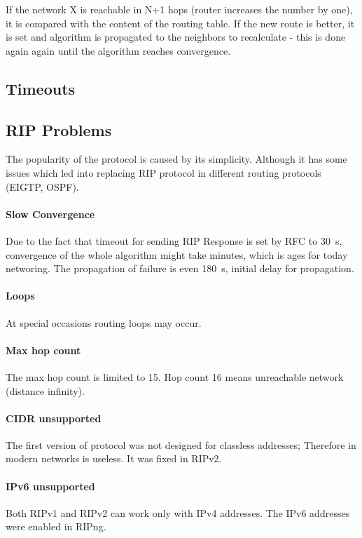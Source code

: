 \documentclass[10pt,a4paper,titlepage]{article}
\begin{document}
    If the network X is reachable in N+1 hops (router increases the number by one), it is compared with the content
    of the routing table. If the new route is better, it is set and algorithm is propagated to the neighbors to
    recalculate - this is done again again until the algorithm reaches convergence.\cite{RIPguide}

    \subsection*{Timeouts}

    \subsection*{RIP Problems}
    The popularity of the protocol is caused by its simplicity. Although it has some issues which led into replacing
    RIP protocol in different routing protocols (EIGTP, OSPF).

    \paragraph{Slow Convergence}
    Due to the fact that timeout for sending RIP Response is set by RFC to 30~s, convergence of the whole algorithm
    might take minutes, which is ages for today networing. The propagation of failure is even 180~s, initial delay
    for propagation.

    \paragraph{Loops}
    At special occasions routing loops may occur.

    \paragraph{Max hop count}
    The max hop count is limited to 15. Hop count 16 means unreachable network (distance infinity).

    \paragraph{CIDR unsupported}
    The first version of protocol was not designed for classless addresses; Therefore in modern networks is useless.
    It was fixed in RIPv2.

    \paragraph{IPv6 unsupported}
    Both RIPv1 and RIPv2 can work only with IPv4 addresses. The IPv6 addresses were enabled in RIPng.
\end{document}
